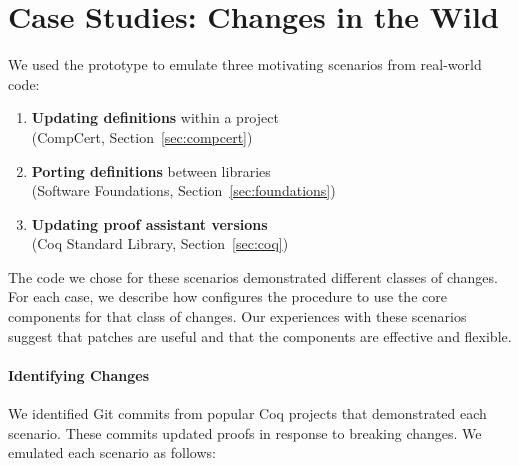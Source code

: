 \section{Case Studies: Changes in the Wild}
\label{sec:case}

We used the \sysname prototype to emulate three motivating scenarios from real-world code:

\begin{enumerate}
\item \textbf{Updating definitions} within a project \\
(CompCert, Section~\ref{sec:compcert})
\item \textbf{Porting definitions} between libraries \\
(Software Foundations, Section~\ref{sec:foundations})
\item \textbf{Updating proof assistant versions} \\
(Coq Standard Library, Section~\ref{sec:coq})
\end{enumerate}

The code we chose for these scenarios demonstrated different classes of changes.
For each case, we describe how \sysname configures the procedure to use the core components for that class of changes.
Our experiences with these scenarios suggest that patches are useful and that the components 
are effective and flexible.




\paragraph{Identifying Changes} We identified Git commits from popular Coq projects that
demonstrated each scenario.
These commits updated proofs in response to breaking changes. %
We emulated each scenario as follows:

